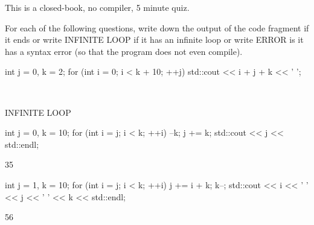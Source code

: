 

This is a closed-book, no compiler, 5 minute quiz.

For each of the following questions,
write down the output of the code fragment if it ends or write
INFINITE LOOP if it has an infinite loop or write ERROR is it has
a syntax error (so that the program does not even compile).

\nextq
\begin{console}[fontsize=\footnotesize]
int j = 0, k = 2;
for (int i = 0; i < k + 10; ++j)
{
    std::cout << i + j + k << ' ';
}
\end{console}
\\
\ANSWER
\begin{answercode}
INFINITE LOOP
\end{answercode}

\nextq
\begin{console}[fontsize=\footnotesize]
int j = 0, k = 10;
for (int i = j; i < k; ++i)
{
    --k;
    j += k;
}
std::cout << j << std::endl;
\end{console}
\ANSWER
\begin{answercode}
35
\end{answercode}

\nextq
\begin{console}[fontsize=\footnotesize]
int j = 1, k = 10;
for (int i = j; i < k; ++i)
{
    j += i + k;
    k--;
}
std::cout << i << ' ' << j << ' ' << k << std::endl;
\end{console}
\ANSWER
\begin{answercode}
56
\end{answercode}


